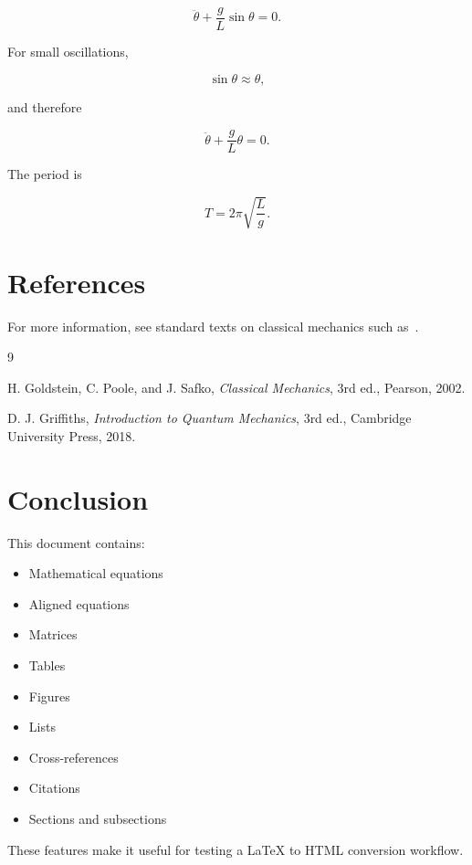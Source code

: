\documentclass[12pt,a4paper]{article}
\begin{document}
	\begin{equation}
		\boxed{
			\ddot{\theta}
			+
			\frac{g}{L}\sin\theta
			=0
		}.
		\label{eq:pendulum}
	\end{equation}
	
	For small oscillations,
	
	\begin{equation}
		\sin\theta \approx \theta,
	\end{equation}
	
	and therefore
	
	\begin{equation}
		\ddot{\theta}
		+
		\frac{g}{L}\theta
		=0.
	\end{equation}
	
	The period is
	
	\begin{equation}
		T = 2\pi\sqrt{\frac{L}{g}}.
	\end{equation}
	
	\section{References}
	
	For more information, see standard texts on classical mechanics
	such as~\cite{goldstein}.
	
	\begin{thebibliography}{9}
		
		H. Goldstein, C. Poole, and J. Safko,
		\textit{Classical Mechanics},
		3rd ed.,
		Pearson, 2002.
		
		D. J. Griffiths,
		\textit{Introduction to Quantum Mechanics},
		3rd ed.,
		Cambridge University Press, 2018.
		
	\end{thebibliography}
	
	\section{Conclusion}
	
	This document contains:
	
	\begin{itemize}
		\item Mathematical equations
		\item Aligned equations
		\item Matrices
		\item Tables
		\item Figures
		\item Lists
		\item Cross-references
		\item Citations
		\item Sections and subsections
	\end{itemize}
	
	These features make it useful for testing a \LaTeX{} to HTML conversion
	workflow.
	
\end{document}
